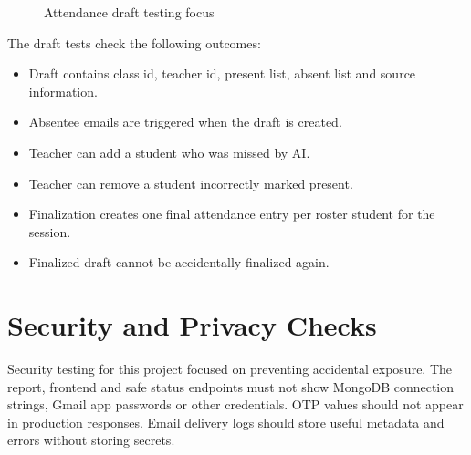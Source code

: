 \begin{figure}[H]
\centering
{}
\caption{Attendance draft testing focus}
\label{fig:draft-testing}
\end{figure}

The draft tests check the following outcomes:

\begin{itemize}
\item Draft contains class id, teacher id, present list, absent list and source information.
\item Absentee emails are triggered when the draft is created.
\item Teacher can add a student who was missed by AI.
\item Teacher can remove a student incorrectly marked present.
\item Finalization creates one final attendance entry per roster student for the session.
\item Finalized draft cannot be accidentally finalized again.
\end{itemize}

\section{Security and Privacy Checks}

Security testing for this project focused on preventing accidental exposure. The report, frontend and safe status endpoints must not show MongoDB connection strings, Gmail app passwords or other credentials. OTP values should not appear in production responses. Email delivery logs should store useful metadata and errors without storing secrets.

